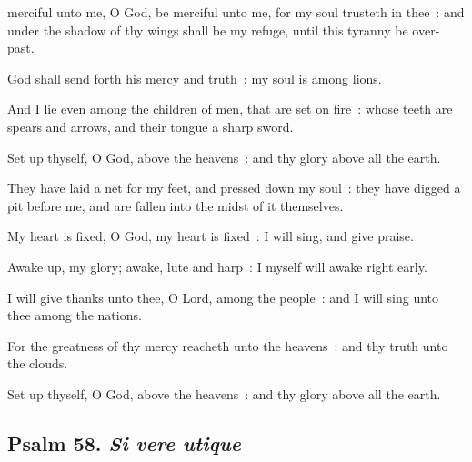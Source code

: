  merciful unto me, O God, be merciful unto me, for my soul trusteth in thee~: and under the shadow of thy wings shall be my refuge, until this tyranny be over-past.\par
{}
God shall send forth his mercy and truth~: my soul is among lions.\par
{}And I lie even among the children of men, that are set on fire~: whose teeth are spears and arrows, and their tongue a sharp sword.\par
{}Set up thyself, O God, above the heavens~: and thy glory above all the earth.\par
{}They have laid a net for my feet, and pressed down my soul~: they have digged a pit before me, and are fallen into the midst of it themselves.\par
{}My heart is fixed, O God, my heart is fixed~: I will sing, and give praise.\par
{}Awake up, my glory; awake, lute and harp~: I myself will awake right early.\par
{}I will give thanks unto thee, O Lord, among the people~: and I will sing unto thee among the nations.\par
{}For the greatness of thy mercy reacheth unto the heavens~: and thy truth unto the clouds.\par
{}Set up thyself, O God, above the heavens~: and thy glory above all the earth.\par

\subsection{Psalm 58. \textit{Si vere utique}}


